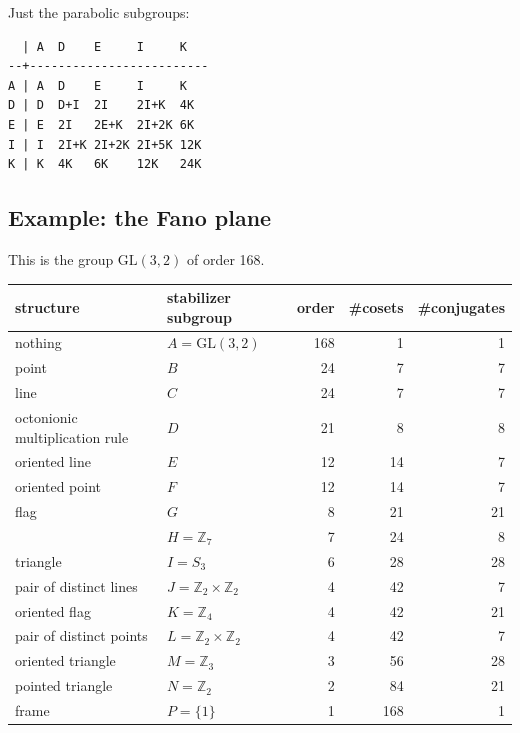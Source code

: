 \documentclass[11pt,oneside]{article}
\newcommand{\Integer}{\mathbb{Z}}
\newcommand{\GL}{\mathrm{GL}}
\begin{document}
Just the parabolic subgroups:

\begin{verbatim}
  | A  D    E     I     K    
--+-------------------------
A | A  D    E     I     K    
D | D  D+I  2I    2I+K  4K   
E | E  2I   2E+K  2I+2K 6K   
I | I  2I+K 2I+2K 2I+5K 12K  
K | K  4K   6K    12K   24K  
\end{verbatim}


\subsection{Example: the Fano plane}

This is the group $\GL(3, 2)$ of order 168.



\begin{samepage}
\begin{center}
\begin{tabular}{ |l|l|r|r|r| }
\hline
structure & stabilizer subgroup & order & \#cosets & \#conjugates \\
\hline
\hline
nothing & $A=\GL(3,2)$ &       168        &  1      &   1         \\
\hline
point   & $B$ &       24        &  7      &   7         \\
\hline
line & $C$ &       24        &  7      &   7         \\
\hline
octonionic multiplication rule & $D$ &       21        &  8      &   8         \\
\hline
oriented line & $E$ &       12        &  14      &   7         \\
\hline
oriented point & $F$ &       12        &  14      &   7         \\
\hline
flag & $G$ &       8        &  21      &   21         \\
\hline
        & $H=\Integer_7 $ &       7        &  24      &   8         \\
\hline
triangle & $I=S_3$ &       6        &  28      &   28         \\
\hline
pair of distinct lines & $J=\Integer_2\times\Integer_2$ & 4 &  42 & 7 \\
\hline
oriented flag & $K=\Integer_4$ &       4        &  42      &   21         \\
\hline
pair of distinct points & $L=\Integer_2\times\Integer_2$ &       4        &  42      &   7 \\
\hline
oriented triangle & $M=\Integer_3$ &       3        &  56      &   28         \\
\hline
pointed triangle & $N=\Integer_2$ &       2        &  84      &   21         \\
\hline
frame & $P=\{1\} $ &       1        &  168      &   1         \\
\hline
\end{tabular}
\end{center}
\end{samepage}
\end{document}
